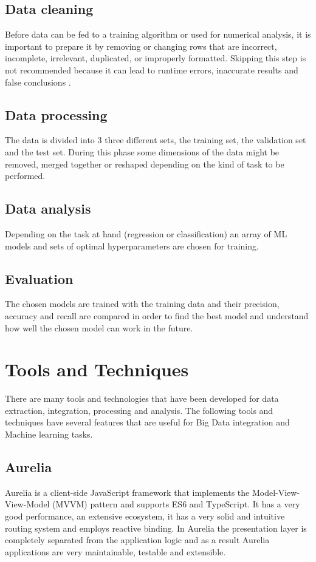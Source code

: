 \subsection{Data cleaning}
Before data can be fed to a training algorithm or used for numerical analysis, it is important to prepare it by removing or changing rows that are incorrect, incomplete, irrelevant, duplicated, or improperly formatted. Skipping this step is not recommended because it can lead to runtime errors, inaccurate results and false conclusions \cite{quantcloud}. 

\subsection{Data processing}
The data is divided into 3 three different sets, the training set, the validation set and the test set. During this phase some dimensions of the data might be removed, merged together or reshaped depending on the kind of task to be performed.

\subsection{Data analysis}
Depending on the task at hand (regression or classification) an array of ML models and sets of optimal hyperparameters are chosen for training. 

\subsection{Evaluation}
The chosen models are trained with the training data and their precision, accuracy and recall are compared in order to find the best model and understand how well the chosen model can work in the future.

\newpage
\section{Tools and Techniques}

There are many tools and technologies that have been  developed for data extraction, integration, processing and analysis. The following tools and techniques have several features that are useful for Big Data integration and Machine learning tasks.

\subsection{Aurelia}
Aurelia is a client-side JavaScript framework that implements the Model-View-View-Model (MVVM) pattern and supports ES6 and TypeScript. It has a very good performance, an extensive ecosystem, it has a very solid and intuitive routing system and employs reactive binding. In Aurelia the presentation layer is completely separated from the application logic and as a result Aurelia applications are very maintainable, testable and extensible. 

